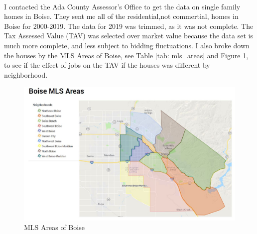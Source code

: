 \documentclass{article}
\begin{document}
\paragraph{} I contacted the Ada County Assessor's Office to get the data on single family homes in Boise. They sent me all of the residential,not commertial, homes in Boise for 2000-2019. The data for 2019 was trimmed, as it was not complete. The Tax Assessed Value (TAV) was selected over market value because the data set is much more complete, and less subject to bidding fluctuations. I also broke down the houses by the MLS Areas of Boise, see Table \ref{tab: mls_areas} and Figure \ref{fig: mls_map}, to see if the effect of jobs on the TAV if the houses was different by neighborhood. \par
\begin{figure}[H]
    \centering
    \includegraphics[width= .8\linewidth]{images/MLS_Areas.JPG}
    \caption{MLS Areas of Boise}
    \label{fig: mls_map}
\end{figure}
\end{document}
